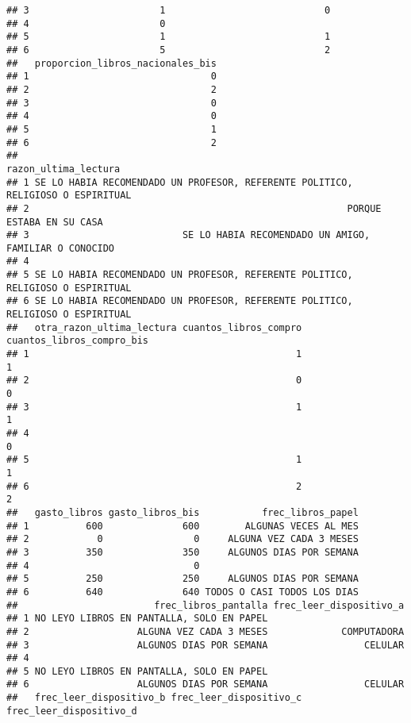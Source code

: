 \documentclass[
]{article}
\begin{document}
\begin{verbatim}
## 3                       1                            0
## 4                       0                             
## 5                       1                            1
## 6                       5                            2
##   proporcion_libros_nacionales_bis
## 1                                0
## 2                                2
## 3                                0
## 4                                0
## 5                                1
## 6                                2
##                                                              razon_ultima_lectura
## 1 SE LO HABIA RECOMENDADO UN PROFESOR, REFERENTE POLITICO, RELIGIOSO O ESPIRITUAL
## 2                                                        PORQUE ESTABA EN SU CASA
## 3                           SE LO HABIA RECOMENDADO UN AMIGO, FAMILIAR O CONOCIDO
## 4                                                                                
## 5 SE LO HABIA RECOMENDADO UN PROFESOR, REFERENTE POLITICO, RELIGIOSO O ESPIRITUAL
## 6 SE LO HABIA RECOMENDADO UN PROFESOR, REFERENTE POLITICO, RELIGIOSO O ESPIRITUAL
##   otra_razon_ultima_lectura cuantos_libros_compro cuantos_libros_compro_bis
## 1                                               1                         1
## 2                                               0                         0
## 3                                               1                         1
## 4                                                                         0
## 5                                               1                         1
## 6                                               2                         2
##   gasto_libros gasto_libros_bis           frec_libros_papel
## 1          600              600        ALGUNAS VECES AL MES
## 2            0                0     ALGUNA VEZ CADA 3 MESES
## 3          350              350     ALGUNOS DIAS POR SEMANA
## 4                             0                            
## 5          250              250     ALGUNOS DIAS POR SEMANA
## 6          640              640 TODOS O CASI TODOS LOS DIAS
##                        frec_libros_pantalla frec_leer_dispositivo_a
## 1 NO LEYO LIBROS EN PANTALLA, SOLO EN PAPEL                        
## 2                   ALGUNA VEZ CADA 3 MESES             COMPUTADORA
## 3                   ALGUNOS DIAS POR SEMANA                 CELULAR
## 4                                                                  
## 5 NO LEYO LIBROS EN PANTALLA, SOLO EN PAPEL                        
## 6                   ALGUNOS DIAS POR SEMANA                 CELULAR
##   frec_leer_dispositivo_b frec_leer_dispositivo_c frec_leer_dispositivo_d

\end{verbatim}
\end{document}
